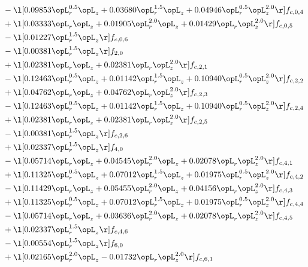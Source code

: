 \begin{alignat}{2}
& - \l[  0.09853 \opL_r^{0.5} \opL_z +  0.03680 \opL_r^{1.5} \opL_z +  0.04946 \opL_r^{0.5} \opL_z^{2.0}  \r] f_{c,0,4} \nonumber \\ 
& + \l[  0.03333 \opL_r \opL_z +  0.01905 \opL_r^{2.0} \opL_z +  0.01429 \opL_r \opL_z^{2.0}  \r] f_{c,0,5} \nonumber \\ 
& - \l[  0.01227 \opL_r^{1.5} \opL_z  \r] f_{c,0,6} \nonumber \\ 
& - \l[  0.00381 \opL_r^{1.5} \opL_z  \r] f_{2,0} \nonumber \\ 
& + \l[  0.02381 \opL_r \opL_z +  0.02381 \opL_r \opL_z^{2.0}  \r] f_{c,2,1} \nonumber \\ 
& - \l[  0.12463 \opL_r^{0.5} \opL_z +  0.01142 \opL_r^{1.5} \opL_z +  0.10940 \opL_r^{0.5} \opL_z^{2.0}  \r] f_{c,2,2} \nonumber \\ 
& + \l[  0.04762 \opL_r \opL_z +  0.04762 \opL_r \opL_z^{2.0}  \r] f_{c,2,3} \nonumber \\ 
& - \l[  0.12463 \opL_r^{0.5} \opL_z +  0.01142 \opL_r^{1.5} \opL_z +  0.10940 \opL_r^{0.5} \opL_z^{2.0}  \r] f_{c,2,4} \nonumber \\ 
& + \l[  0.02381 \opL_r \opL_z +  0.02381 \opL_r \opL_z^{2.0}  \r] f_{c,2,5} \nonumber \\ 
& - \l[  0.00381 \opL_r^{1.5} \opL_z  \r] f_{c,2,6} \nonumber \\ 
& + \l[  0.02337 \opL_r^{1.5} \opL_z  \r] f_{4,0} \nonumber \\ 
& - \l[  0.05714 \opL_r \opL_z +  0.04545 \opL_r^{2.0} \opL_z +  0.02078 \opL_r \opL_z^{2.0}  \r] f_{c,4,1} \nonumber \\ 
& + \l[  0.11325 \opL_r^{0.5} \opL_z +  0.07012 \opL_r^{1.5} \opL_z +  0.01975 \opL_r^{0.5} \opL_z^{2.0}  \r] f_{c,4,2} \nonumber \\ 
& - \l[  0.11429 \opL_r \opL_z +  0.05455 \opL_r^{2.0} \opL_z +  0.04156 \opL_r \opL_z^{2.0}  \r] f_{c,4,3} \nonumber \\ 
& + \l[  0.11325 \opL_r^{0.5} \opL_z +  0.07012 \opL_r^{1.5} \opL_z +  0.01975 \opL_r^{0.5} \opL_z^{2.0}  \r] f_{c,4,4} \nonumber \\ 
& - \l[  0.05714 \opL_r \opL_z +  0.03636 \opL_r^{2.0} \opL_z +  0.02078 \opL_r \opL_z^{2.0}  \r] f_{c,4,5} \nonumber \\ 
& + \l[  0.02337 \opL_r^{1.5} \opL_z  \r] f_{c,4,6} \nonumber \\ 
& - \l[  0.00554 \opL_r^{1.5} \opL_z  \r] f_{6,0} \nonumber \\ 
& + \l[  0.02165 \opL_r^{2.0} \opL_z   -0.01732 \opL_r \opL_z^{2.0}  \r] f_{c,6,1} \nonumber \\ 

\end{alignat}
